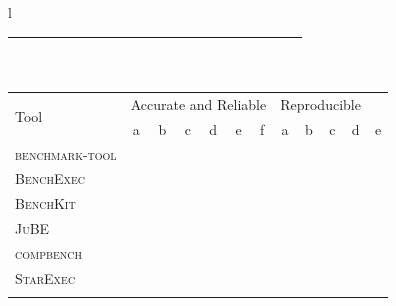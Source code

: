 \begin{table}
\begin{threeparttable}
\begin{adjustbox}{max width=\textwidth}
\begin{tabular}{l}
\begin{tabular}{l | cccccccccc | cccccccccc}
					\textbf{\OurBenchmarkingTool} &
						\pmb{\checkmark} & \pmb{\checkmark} & \pmb{\checkmark} & \pmb{\checkmark} & \pmb{\checkmark} & \pmb{\checkmark} & \pmb{\checkmark} &\pmb{\checkmark} & \pmb{\checkmark} & \pmb{\checkmark} &
						\pmb{\checkmark} & \pmb{\checkmark} & \pmb{\checkmark} & \pmb{\checkmark} & & \pmb{\checkmark} & \pmb{\checkmark} & \pmb{\checkmark} & \pmb{\checkmark} & \\
                    \bottomrule
                \end{tabular}\\
                \begin{tabular}{l | cccccc | ccccc}
                    \multirow{2}{*}{Tool} &
                        \multicolumn{6}{c|}{Accurate and Reliable} &
                        \multicolumn{4}{c}{Reproducible}\\
                        & a & b & c & d & e & f &
                        a & b & c & d & e\\
                    \midrule
                    \textsc{benchmark-tool} &
                        & & & \checkmark & &
                        & & \checkmark & & & \\
                    \textsc{BenchExec} &
                        \checkmark & \checkmark & \checkmark & \checkmark & \checkmark & \checkmark &
                        \checkmark & \checkmark & \checkmark & & \checkmark
                        \\
                    \textsc{BenchKit} &
                        & \checkmark & & \checkmark & & \checkmark &
                        & & & & \checkmark  \\
                    \textsc{JuBE} &
                        \textasteriskcentered & \textasteriskcentered & \textasteriskcentered & \textasteriskcentered & \textasteriskcentered & \textasteriskcentered &
                        & \checkmark & \checkmark \\
                    \textsc{compbench} &
                        & & & & & &
                        & \checkmark & \checkmark & & \checkmark \\
                    \textsc{StarExec} &
                        \checkmark & \checkmark & \checkmark & \checkmark & \checkmark & \checkmark &
						\checkmark & \checkmark & \checkmark & \checkmark & \checkmark \\
					\textbf{\OurBenchmarkingTool} &
						\textbf{\textasteriskcentered} & \textbf{\textasteriskcentered} & \textbf{\textasteriskcentered} & \textbf{\textasteriskcentered} & \textbf{\textasteriskcentered} & \textbf{\textasteriskcentered} &

\end{tabular}
\end{tabular}
\end{adjustbox}
\end{threeparttable}
\end{table}
